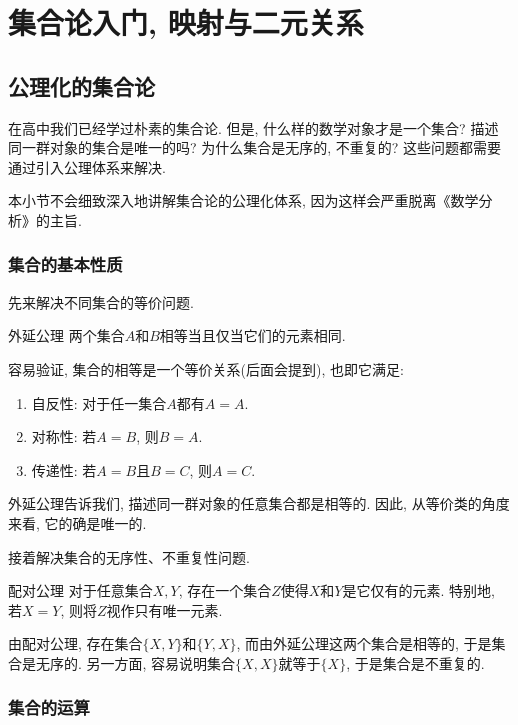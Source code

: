 \chapter{集合论入门, 映射与二元关系}

\section{公理化的集合论}

在高中我们已经学过朴素的集合论. 但是, 什么样的数学对象才是一个集合? 描述同一群对象的集合是唯一的吗? 为什么集合是无序的, 不重复的? 这些问题都需要通过引入公理体系来解决. 

本小节不会细致深入地讲解集合论的公理化体系, 因为这样会严重脱离《数学分析》的主旨. 

\subsection{集合的基本性质}

先来解决不同集合的等价问题. 

\begin{axiom}{外延公理}
	两个集合$A$和$B$相等当且仅当它们的元素相同.
\end{axiom}

容易验证, 集合的相等是一个等价关系(后面会提到), 也即它满足: 
\begin{enumerate}
	\item 自反性: 对于任一集合$A$都有$A=A$.
	\item 对称性: 若$A=B$, 则$B=A$.
	\item 传递性: 若$A=B$且$B=C$, 则$A=C$.
\end{enumerate}

外延公理告诉我们, 描述同一群对象的任意集合都是相等的. 因此, 从等价类的角度来看, 它的确是唯一的. 

接着解决集合的无序性、不重复性问题. 

\begin{axiom}{配对公理}
	对于任意集合$X, Y$, 存在一个集合$Z$使得$X$和$Y$是它仅有的元素. 特别地, 若$X=Y$, 则将$Z$视作只有唯一元素. 
\end{axiom}

由配对公理, 存在集合$\{ X, Y \}$和$\{ Y, X \}$, 而由外延公理这两个集合是相等的, 于是集合是无序的. 另一方面, 容易说明集合$\{ X, X \}$就等于$\{ X \}$, 于是集合是不重复的. 

\subsection{集合的运算}

